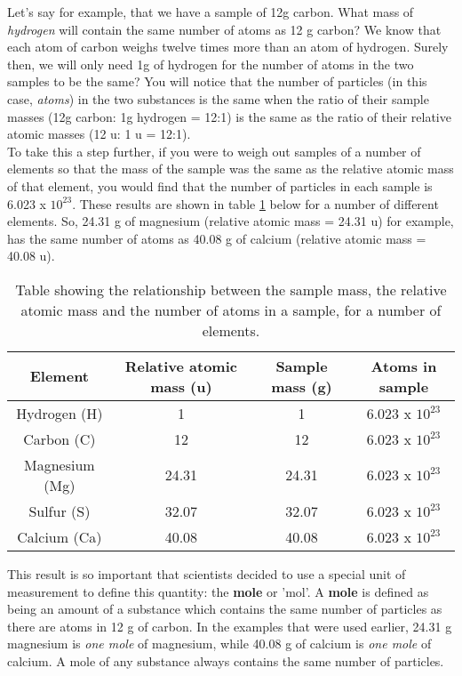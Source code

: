 Let's say for example, that we have a sample of 12g carbon. What mass of \textit{hydrogen} will contain the same number of atoms as 12 g carbon? We know that each atom of carbon weighs twelve times more than an atom of hydrogen. Surely then, we will only need 1g of hydrogen for the number of atoms in the two samples to be the same? You will notice that the number of particles (in this case, \textit{atoms}) in the two substances is the same when the ratio of their sample masses (12g carbon: 1g hydrogen = 12:1) is the same as the ratio of their relative atomic masses (12 u: 1 u = 12:1).\\

To take this a step further, if you were to weigh out samples of a number of elements so that the mass of the sample was the same as the relative atomic mass of that element, you would find that the number of particles in each sample is 6.023 x $10^{23}$. These results are shown in table \ref{tab:quant:atoms} below for a number of different elements. So, 24.31 g of magnesium (relative atomic mass = 24.31 u) for example, has the same number of atoms as 40.08 g of calcium (relative atomic mass = 40.08 u). \\

\begin{table}[!h]
\begin{center}
\caption{Table showing the relationship between the sample mass, the relative atomic mass and the number of atoms in a sample, for a number of elements.}
\label{tab:quant:atoms}
\begin{tabular}{|c|c|c|c|}\hline
\textbf{Element} & \textbf{Relative atomic mass (u)} & \textbf{Sample mass (g)} & \textbf{Atoms in sample}\\\hline
Hydrogen (H) & 1 & 1 & 6.023 x $10^{23}$\\\hline
Carbon (C) & 12 & 12 & 6.023 x $10^{23}$\\\hline
Magnesium (Mg) & 24.31 & 24.31 & 6.023 x $10^{23}$\\\hline
Sulfur (S) & 32.07 & 32.07 & 6.023 x $10^{23}$\\\hline
Calcium (Ca) & 40.08 & 40.08 & 6.023 x $10^{23}$\\\hline
\end{tabular}
\end{center}
\end{table}

This result is so important that scientists decided to use a special unit of measurement to define this quantity: the \textbf{mole} or 'mol'. A \textbf{mole} is defined as being an amount of a substance which contains the same number of particles as there are atoms in 12 g of carbon. In the examples that were used earlier, 24.31 g magnesium is \textit{one mole} of magnesium, while 40.08 g of calcium is \textit{one mole} of calcium. A mole of any substance always contains the same number of particles.

